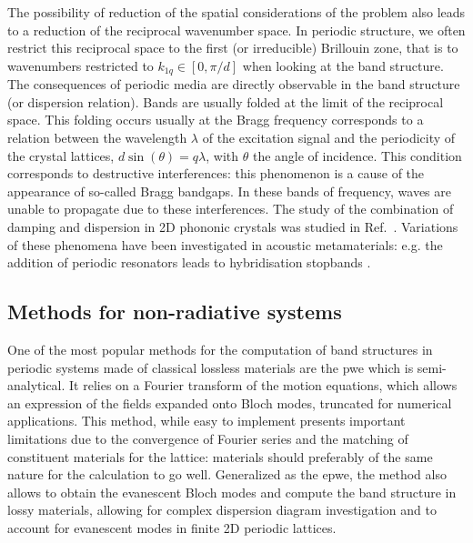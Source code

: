 The possibility of reduction of the spatial considerations of the problem also leads to a reduction of the reciprocal wavenumber space. In periodic structure, we often restrict this reciprocal space to the first (or irreducible) Brillouin zone, that is to wavenumbers restricted to $k_{1q} \in [0, \pi/d]$ when looking at the band structure. The consequences of periodic media are directly observable in the band structure (or dispersion relation). Bands are usually folded at the limit of the reciprocal space. This folding occurs usually at the Bragg frequency corresponds to a relation between the wavelength $\lambda$ of the excitation signal and the periodicity of the crystal lattices, $d \sin(\theta) = q \lambda$, with $\theta$ the angle of incidence. This condition corresponds to destructive interferences: this phenomenon is a cause of the appearance of so-called Bragg bandgaps. In these bands of frequency, waves are unable to propagate\cite{sigalas1992, laude2009} due to these interferences. The study of the combination of damping and dispersion in 2D phononic crystals was studied in Ref.~\cite{moiseyenko2011}. Variations of these phenomena have been investigated in acoustic metamaterials: e.g. the addition of periodic resonators leads to hybridisation stopbands \cite{fang2006,krasikova2024}.

\subsection{Methods for non-radiative systems}
One of the most popular methods for the computation of band structures in periodic systems made of classical lossless materials are the \acrfull{pwe} which is semi-analytical. It relies on a Fourier transform of the motion equations, which allows an expression of the fields expanded onto Bloch modes, truncated for numerical applications. This method, while easy to implement presents important limitations due to the convergence of Fourier series and the matching of constituent materials for the lattice: materials should preferably of the same nature for the calculation to go well\cite{jimenez2021}. Generalized as the \acrfull{epwe}, the method also allows to obtain the evanescent Bloch modes \cite{laude2009, schalcher2023} and compute the band structure in lossy materials\cite{moiseyenko2011}, allowing for complex dispersion diagram investigation and to account for evanescent modes in finite 2D periodic lattices. 

